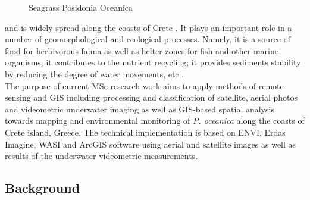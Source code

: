 \documentclass[10pt, a4paper]{article}
\begin{document}
\begin{figure}[h]
	\centering
	\hspace{2mm}
	\caption{Seagrass Posidonia Oceanica}
	\label{fig:1}
\end{figure}

and is widely spread along the coasts of Crete \cite{Dumay02} \label{Dumay02}. 
It plays an important role in a number
of geomorphological and ecological processes. Namely, it is a source of food for herbivorous fauna as
well as helter zones for fish and other marine organisms; it contributes to the nutrient recycling; it
provides sediments stability by reducing the degree of water movements, etc \cite{Francour99}\label{Francour99}.\\
The purpose of current MSc research work aims to apply methods of remote sensing and GIS
including processing and classification of satellite, aerial photos and videometric underwater imaging
as well as GIS-based spatial analysis towards mapping and environmental monitoring of \emph{P. oceanica}
along the coasts of Crete island, Greece. The technical implementation is based on ENVI, Erdas
Imagine, WASI and ArcGIS software using aerial and satellite images as well as results of the
underwater videometric measurements.

\subsection{Background}
\end{document}

